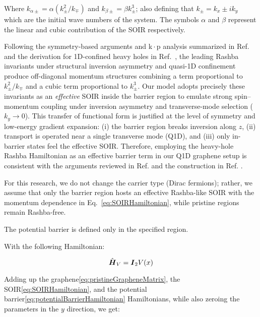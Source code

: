 \noindent Where $k_{\alpha\pm} = \alpha\left(k_{\pm}^2/k_{\mp}\right)$ and $k_{\beta\pm} = \beta k_{\pm}^3$; also defining that $k_{\pm}=k_x\pm i k_y$ which are the initial wave numbers of the system.
The symbols $\alpha$ and $\beta$ represent the linear and cubic contribution of the SOIR respectively.

Following the symmetry-based arguments and k\,$\cdot$\,p analysis summarized in Ref.~\cite{Serna2019} and the derivation for 1D-confined heavy holes in Ref.~\cite{RCDiagoEPL2015}, the leading Rashba invariants under structural inversion asymmetry and quasi-1D confinement produce off-diagonal momentum structures combining a term proportional to $k_{\pm}^2/k_{\mp}$ and a cubic term proportional to $k_{\pm}^3$.
Our model adopts precisely these invariants as an \emph{effective} SOIR inside the barrier region to emulate strong spin--momentum coupling under inversion asymmetry and transverse-mode selection ($k_y\!\to\!0$).
This transfer of functional form is justified at the level of symmetry and low-energy gradient expansion: (i) the barrier region breaks inversion along $z$, (ii) transport is operated near a single transverse mode (Q1D), and (iii) only in-barrier states feel the effective SOIR\@.
Therefore, employing the heavy-hole Rashba Hamiltonian as an effective barrier term in our Q1D graphene setup is consistent with the arguments reviewed in Ref. \cite{Serna2019} and the construction in Ref. \cite{RCDiagoEPL2015}.




For this research, we do not change the carrier type (Dirac fermions); rather, we assume that only the barrier region hosts an effective Rashba-like SOIR with the momentum dependence in Eq.~\eqref{eq:SOIRHamiltonian}, while pristine regions remain Rashba-free.

The potential barrier is defined only in the specified region.

With the following Hamiltonian:

\begin{equation}
    \label{eq:potentialBarrierHamiltonian}
    \hat{\mbox{\boldmath $H$}}_V=\mbox{\boldmath $I$}_2 V(x)
\end{equation}

Adding up the graphene\eqref{eq:pristineGrapheneMatrix}, the SOIR\eqref{eq:SOIRHamiltonian}, and the potential barrier\eqref{eq:potentialBarrierHamiltonian} Hamiltonians, while also zeroing the parameters in the $y$ direction, we get:

